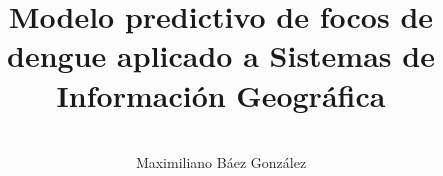 \documentclass[oneside]{beamer}
\author{\  \\ Maximiliano Báez González}
\title{Modelo predictivo de focos de dengue aplicado a Sistemas de Información Geográfica}
\institute{Facultad Politécnica- UNA}
\date{\thismonth}
\begin{document}
\renewcommand{\inserttotalframenumber}{55}
\begin{frame}[t,plain]
\titlepage
\end{frame}










\end{document}
